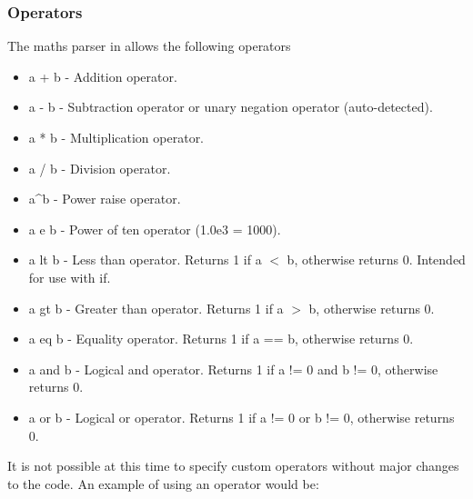 \subsubsection{Operators}
The maths parser in {\EPOCH} allows the following operators
\begin{itemize}
\item a + b - Addition operator.
\item a - b - Subtraction operator or unary negation operator (auto-detected).
\item a * b - Multiplication operator.
\item a / b - Division operator.
\item a\^{}b - Power raise operator.
\item a e b - Power of ten operator (1.0e3 = 1000).
\item a lt b - Less than operator. Returns 1 if a $<$ b, otherwise returns
  0. Intended for use with if.
\item a gt b - Greater than operator. Returns 1 if a $>$ b, otherwise returns 0.
\item a eq b - Equality operator. Returns 1 if a == b, otherwise returns 0.
\item a and b - Logical and operator. Returns 1 if a != 0 and b != 0,
  otherwise returns 0.
\item a or b - Logical or operator. Returns 1 if a != 0 or b != 0, otherwise
  returns 0.
\end{itemize}

It is not possible at this time to specify custom operators without major
changes to the code. An example of using an operator would be:\\
\indent{}\\

